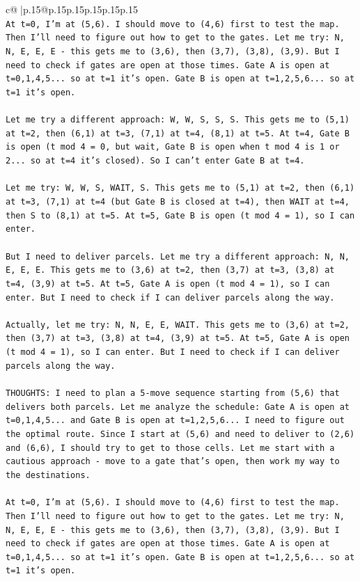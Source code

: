 \documentclass{article}
\begin{document}
{\begin{supertabular}{c@{$\;$}|p{.15\linewidth}@{}p{.15\linewidth}p{.15\linewidth}p{.15\linewidth}p{.15\linewidth}p{.15\linewidth}}
{{{\\ 
\texttt{At t=0, I'm at (5,6). I should move to (4,6) first to test the map. Then I'll need to figure out how to get to the gates. Let me try: N, N, E, E, E {-} this gets me to (3,6), then (3,7), (3,8), (3,9). But I need to check if gates are open at those times. Gate A is open at t=0,1,4,5... so at t=1 it's open. Gate B is open at t=1,2,5,6... so at t=1 it's open.} \\
\\ 
\texttt{Let me try a different approach: W, W, S, S, S. This gets me to (5,1) at t=2, then (6,1) at t=3, (7,1) at t=4, (8,1) at t=5. At t=4, Gate B is open (t mod 4 = 0, but wait, Gate B is open when t mod 4 is 1 or 2... so at t=4 it's closed). So I can't enter Gate B at t=4.} \\
\\ 
\texttt{Let me try: W, W, S, WAIT, S. This gets me to (5,1) at t=2, then (6,1) at t=3, (7,1) at t=4 (but Gate B is closed at t=4), then WAIT at t=4, then S to (8,1) at t=5. At t=5, Gate B is open (t mod 4 = 1), so I can enter.} \\
\\ 
\texttt{But I need to deliver parcels. Let me try a different approach: N, N, E, E, E. This gets me to (3,6) at t=2, then (3,7) at t=3, (3,8) at t=4, (3,9) at t=5. At t=5, Gate A is open (t mod 4 = 1), so I can enter. But I need to check if I can deliver parcels along the way.} \\
\\ 
\texttt{Actually, let me try: N, N, E, E, WAIT. This gets me to (3,6) at t=2, then (3,7) at t=3, (3,8) at t=4, (3,9) at t=5. At t=5, Gate A is open (t mod 4 = 1), so I can enter. But I need to check if I can deliver parcels along the way.} \\
\\ 
\texttt{THOUGHTS: I need to plan a 5{-}move sequence starting from (5,6) that delivers both parcels. Let me analyze the schedule: Gate A is open at t=0,1,4,5... and Gate B is open at t=1,2,5,6... I need to figure out the optimal route. Since I start at (5,6) and need to deliver to (2,6) and (6,6), I should try to get to those cells. Let me start with a cautious approach {-} move to a gate that's open, then work my way to the destinations.} \\
\\ 
\texttt{At t=0, I'm at (5,6). I should move to (4,6) first to test the map. Then I'll need to figure out how to get to the gates. Let me try: N, N, E, E, E {-} this gets me to (3,6), then (3,7), (3,8), (3,9). But I need to check if gates are open at those times. Gate A is open at t=0,1,4,5... so at t=1 it's open. Gate B is open at t=1,2,5,6... so at t=1 it's open.} \\
}}}
\end{supertabular}}
\end{document}
